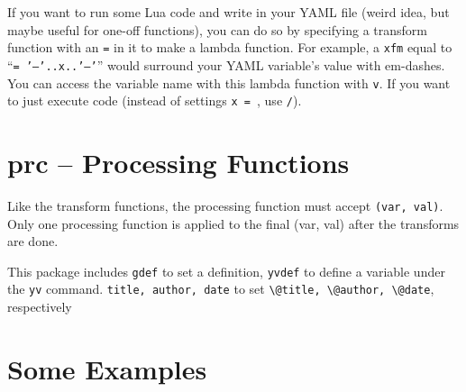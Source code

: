 \documentclass[11pt,parskip=half]{scrartcl}
\begin{document}
If you want to run some Lua code and write in your YAML file (weird idea, but maybe useful for one-off functions),
you can do so by specifying a transform function with an \texttt{=} in it to make a lambda function.
For example, a \texttt{xfm} equal to
``\texttt{= '---'..x..'---'}''
would surround your YAML variable's value with em-dashes.
You can access the variable name with this lambda function with \texttt{v}.
If you want to just execute code (instead of settings \texttt{x = }, use \texttt{/}).

  \section{prc -- Processing Functions}
Like the transform functions, the processing function must accept \texttt{(var, val)}.
Only one processing function is applied to the final (var, val) after the transforms are done.

This package includes \texttt{gdef} to set a definition, \texttt{yvdef} to define a variable under the \texttt{yv} command.
\texttt{title, author, date} to set \texttt{\textbackslash @title, \textbackslash @author, \textbackslash @date},
respectively

\pagebreak

\section{Some Examples}

\end{document}

